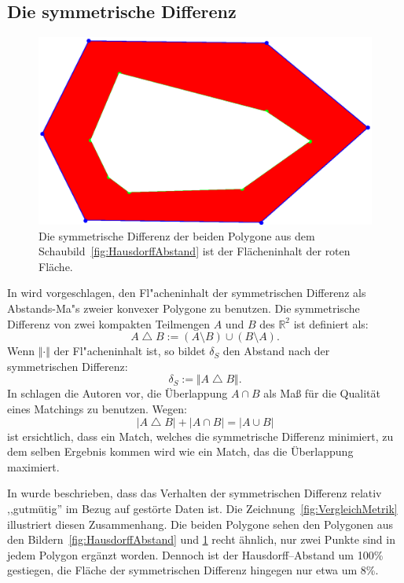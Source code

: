 \subsection{Die symmetrische Differenz}\label{symDiff}
\begin{figure}
	\centering
	\includegraphics[scale=.6]{SymDiff.eps}
	\caption[Die symmetrische Differenz zweier Polygone]{Die symmetrische Differenz der beiden Polygone aus dem Schaubild~\ref{fig:HausdorffAbstand} ist der Flächeninhalt der roten Fläche.}
	\label{fig:SymDiffBild}
\end{figure}

In \cite{AFRW} wird vorgeschlagen, den Fl"acheninhalt der symmetrischen Differenz als Abstands-Ma"s zweier konvexer Polygone zu benutzen. Die symmetrische Differenz von zwei kompakten Teilmengen $A$ und $B$ des $\mathbb{R}^2 $ ist definiert als:
\[A\bigtriangleup B:=(A\setminus B)\cup(B\setminus A).\]
Wenn $\Vert\cdot\Vert$ der Fl"acheninhalt ist, so bildet $\delta_S$ den Abstand nach der symmetrischen Differenz:
\[\delta_S:=\Vert A \bigtriangleup B\Vert.\]
In \cite{TG} schlagen die Autoren vor, die Überlappung $A\cap B$ als Maß für die Qualität eines Matchings zu benutzen. Wegen:
$$|A\bigtriangleup B|+|A\cap B|=|A\cup B|$$
ist ersichtlich, dass ein Match, welches die symmetrische Differenz minimiert, zu dem selben Ergebnis kommen wird wie ein Match, das die Überlappung maximiert.

In \cite{AFRW} wurde beschrieben, dass das Verhalten der symmetrischen Differenz relativ ,,gutmütig'' im Bezug auf gestörte Daten ist. Die Zeichnung~\ref{fig:VergleichMetrik} illustriert diesen Zusammenhang. Die beiden Polygone sehen den Polygonen aus den Bildern~\ref{fig:HausdorffAbstand} und \ref{fig:SymDiffBild} recht ähnlich, nur zwei Punkte sind in jedem Polygon ergänzt worden. Dennoch ist der Hausdorff--Abstand um 100\% gestiegen, die Fläche der symmetrischen Differenz hingegen nur etwa um 8\%.

